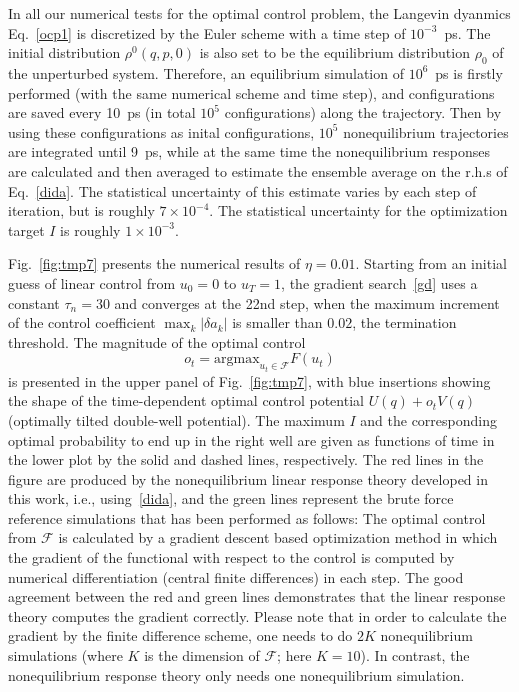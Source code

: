 \documentclass[]{tMPH2e}
\newcommand{\recheck}[1]{{\color{red} #1}}
\newcommand{\redc}[1]{{\color{red} #1}}
\begin{document}
\recheck{ In all our numerical tests for the optimal control problem, the
  Langevin dyanmics Eq.~\eqref{ocp1} is discretized by the Euler
  scheme with a time step of $10^{-3}$~\textsf{ps}.
  The initial distribution $\rho^0(q,p,0)$ is also set to be the
  equilibrium distribution $\rho_0$ of the unperturbed system.
  Therefore, an equilibrium simulation of $10^6$~\textsf{ps} is firstly performed (with
  the same numerical scheme and time step), and
  configurations are saved every 10~\textsf{ps} (in total $10^5$
  configurations) along the trajectory.
  Then by using these configurations as inital configurations,
  $10^5$ nonequilibrium
  trajectories are integrated until 9~\textsf{ps}, while at the same time
  the nonequilibrium responses are calculated and then averaged to
  estimate the ensemble average on the r.h.s of Eq.~\eqref{dida}.
  The statistical
  uncertainty of this estimate varies by each step of iteration, but
  is roughly $7\times10^{-4}$.  The statistical uncertainty for the 
  optimization target $I$ is roughly $1\times10^{-3}$.
}

Fig.~\ref{fig:tmp7} presents the numerical results of $\eta = 0.01$.
Starting from an initial guess of linear control from $u_0 = 0$ to
$u_T = 1$,
the gradient search~\eqref{gd} \recheck{uses a constant $\tau_n = 30$ and} converges at the 22nd step, when the
maximum increment of the control coefficient $\max_k\vert \delta a_k\vert$
is smaller than $0.02$, the termination threshold.
The magnitude of the optimal
control 
\[
o_t = \textrm{argmax}_{u_t \in\mathcal F} F(u_t)
\] 
is presented in the upper panel of Fig.~\ref{fig:tmp7},
with blue insertions showing the shape of the time-dependent optimal control potential 
$U(q) + o_t V(q)$ (optimally tilted double-well potential). 
The maximum $I$ and the corresponding optimal probability to end up in the right well are
given as functions of time in the lower plot by the solid and dashed lines, respectively.
The red lines in the figure are produced by the nonequilibrium
linear response theory developed in this work, i.e., using~\eqref{dida},
and the green lines represent the brute force reference simulations that has been performed as follows: The optimal control from ${\mathcal F}$ is calculated by a gradient descent based optimization method in which the gradient of the functional with respect to the control is computed by numerical differentiation (central finite differences) in each step.
The good agreement between the red and green lines demonstrates that 
the linear response theory computes the gradient correctly.
Please note that in order to calculate the gradient by the finite difference scheme, one
needs to do $2K$ nonequilibrium simulations
(where $K$ is the dimension of ${\mathcal F}$; here $K = 10$). In contrast, the nonequilibrium response theory only needs one nonequilibrium simulation.
\end{document}
